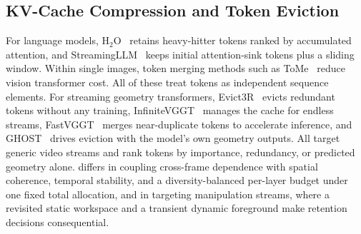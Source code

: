 \subsection{KV-Cache Compression and Token Eviction}
For language models, H$_2$O~\cite{zhang2023h2o} retains heavy-hitter tokens ranked by accumulated attention, and StreamingLLM~\cite{xiao2024streamingllm} keeps initial attention-sink tokens plus a sliding window. Within single images, token merging methods such as ToMe~\cite{bolya2023tome} reduce vision transformer cost. All of these treat tokens as independent sequence elements. For streaming geometry transformers, Evict3R~\cite{mahdi2025evict3r} evicts redundant tokens without any training, InfiniteVGGT~\cite{yuan2026infinitevggt} manages the cache for endless streams, FastVGGT~\cite{wang2026fastvggt} merges near-duplicate tokens to accelerate inference, and GHOST~\cite{chen2026ghost} drives eviction with the model's own geometry outputs. All target generic video streams and rank tokens by importance, redundancy, or predicted geometry alone. \method{} differs in coupling cross-frame dependence with spatial coherence, temporal stability, and a diversity-balanced per-layer budget under one fixed total allocation, and in targeting manipulation streams, where a revisited static workspace and a transient dynamic foreground make retention decisions consequential.
